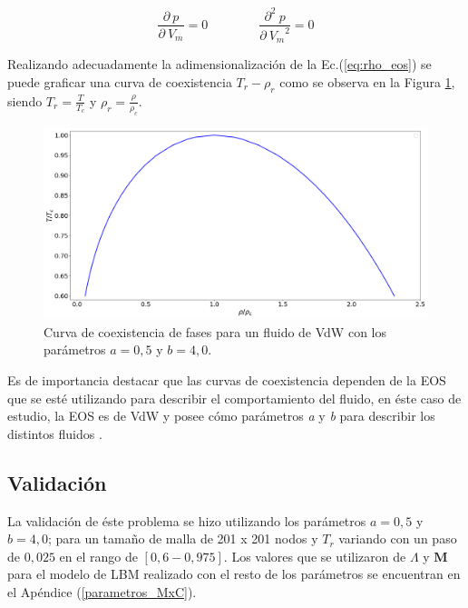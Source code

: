\begin{equation}
	\frac{\partial\> p}{\partial\> V_{m}} = 0 \qquad \qquad \frac{\partial^{2} \> p}{\partial\> {V_{m}}^{2}} = 0
	\label{eq:criterio_1_2_deriv}
\end{equation}

Realizando adecuadamente la adimensionalización  de la Ec.(\ref{eq:rho_eos}) se puede graficar una curva de coexistencia $T_r - \rho_r$  como se observa en la Figura \ref{fig:T_r_rho_r_analitico}, siendo $T_r = \frac{T}{T_c}$ y $\rho_r = \frac{\rho}{\rho_c}$.

\begin{figure}[htbp]
	\centering
	\includegraphics[width=\textwidth]{figs/cap4/Diagrama_T_r_vs_rho_r_analitico_1}
	\caption{Curva de coexistencia de fases para un fluido de VdW con los parámetros $a = 0,5 $ y $b = 4,0 $.}
	\label{fig:T_r_rho_r_analitico}	
\end{figure}

\newpage
Es de importancia destacar que las curvas de coexistencia dependen de la EOS que se esté utilizando para describir el comportamiento del fluido, en éste caso de estudio, la EOS es de VdW y posee  cómo parámetros \textit{a} y \textit{b} para describir los distintos fluidos .

\subsection{Validación}

La validación de éste problema se hizo utilizando los parámetros $a =0,5$ y $b = 4,0$; para un tamaño de malla de 201 x 201 nodos y $T_r$ variando con un paso de $0,025$ en el rango de $[0,6 - 0,975]$.  Los valores que se utilizaron de $\Lambda$ y $\mathbf{M}$ para el modelo de LBM realizado  con el resto de los parámetros se encuentran en el Apéndice (\ref{parametros_MxC}).

